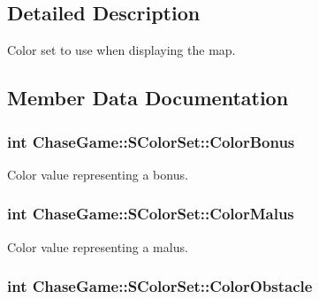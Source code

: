 \subsection{Detailed Description}
Color set to use when displaying the map. 

\subsection{Member Data Documentation}
\hypertarget{struct_chase_game_1_1_s_color_set_aacd34496b36640358ecae127f6bb6cc4}{
\subsubsection[{Color\-Bonus}]{\setlength{\rightskip}{0pt plus 5cm}int Chase\-Game\-::\-S\-Color\-Set\-::\-Color\-Bonus}}\label{struct_chase_game_1_1_s_color_set_aacd34496b36640358ecae127f6bb6cc4}


Color value representing a bonus. 

\hypertarget{struct_chase_game_1_1_s_color_set_aa2eb52b7d1fb4059da9935a230715498}{
\subsubsection[{Color\-Malus}]{\setlength{\rightskip}{0pt plus 5cm}int Chase\-Game\-::\-S\-Color\-Set\-::\-Color\-Malus}}\label{struct_chase_game_1_1_s_color_set_aa2eb52b7d1fb4059da9935a230715498}


Color value representing a malus. 

\hypertarget{struct_chase_game_1_1_s_color_set_acb1e4df5c042ae8ca8a66d7de26a9148}{
\subsubsection[{Color\-Obstacle}]{\setlength{\rightskip}{0pt plus 5cm}int Chase\-Game\-::\-S\-Color\-Set\-::\-Color\-Obstacle}}\label{struct_chase_game_1_1_s_color_set_acb1e4df5c042ae8ca8a66d7de26a9148}



